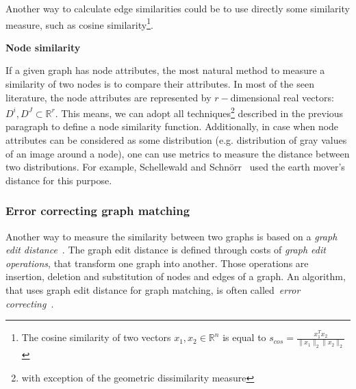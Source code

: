 Another way to calculate edge similarities could be to use directly some similarity measure, such as cosine similarity\footnote{The cosine similarity of two vectors $x_1,x_2\in\mathbb{R}^n$ is equal to $s_{cos}=\frac{x_1^Tx_2}{\|x_1\|_2\|x_2\|_2}$}.

\textbf{Node similarity}

If a given graph has node attributes, the most natural method to measure a similarity of two nodes is to compare their attributes. In most of the seen literature, the node attributes are represented by $r-$dimensional real vectors: $D^i,D^J\subset\mathbb{R}^r$. This means, we can adopt all techniques\footnote{with exception of the geometric dissimilarity measure} described in the previous paragraph to define a node similarity function. Additionally, in case when node attributes can be considered as some distribution (e.g. distribution of gray values of an image around a node), one can use metrics to measure the distance between two distributions. For example, Schellewald and Schn\"orr~\cite{Schellewald2005} used the earth mover's distance for this purpose.
\subsubsection{Error correcting graph matching}
Another way to measure the similarity between two graphs is based on a \emph{graph edit distance}~\cite{Bunke1983_inexactGM}. The graph edit distance is defined through costs of \emph{graph edit operations}, that transform one graph into another. Those operations are insertion, deletion and substitution of nodes and edges of a graph. An algorithm, that uses graph edit distance for graph matching, is often called~\emph{error correcting}~\cite{Conte2004}.

